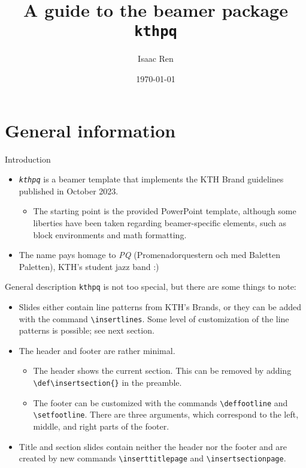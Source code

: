 \documentclass[17pt, t, lualatex]{beamer}
\title{A guide to the beamer package \texttt{kthpq}}
\date{\today}
\institute[KTH]{KTH Royal Institute of Technology}
\author[Isaac Ren]{Isaac Ren}
\def\kthpq{\texttt{kthpq}}
\begin{document}
\inserttitlepage[center]

\begin{frame}
\tableofcontents
\end{frame}

\section{General information}

\insertsectionpage

\begin{frame}{Introduction}
\begin{itemize}
\item \emph{\kthpq{}} is a beamer template that implements the KTH Brand guidelines published in October 2023.
\begin{itemize}
\item The starting point is the provided PowerPoint template, although some liberties have been taken regarding beamer-specific elements, such as block environments and math formatting.
\end{itemize}
\item The name pays homage to \emph{PQ} (Promenadorquestern och med Baletten Paletten), KTH's student jazz band :)
\end{itemize}
\end{frame}

\begin{frame}[fragile=singleslide]{General description}
\kthpq{} is not too special, but there are some things to note:
\begin{itemize}
\item Slides either contain line patterns from KTH's Brands, or they can be added with the command \verb|\insertlines|. Some level of customization of the line patterns is possible; see next section.
\item The header and footer are rather minimal.
\begin{itemize}
\item The header shows the current section. This can be removed by adding \verb|\def\insertsection{}| in the preamble.
\item The footer can be customized with the commands \verb|\deffootline| and \verb|\setfootline|. There are three arguments, which correspond to the left, middle, and right parts of the footer.
\end{itemize}
\item Title and section slides contain neither the header nor the footer and are created by new commands \verb|\inserttitlepage| and \verb|\insertsectionpage|.
\end{itemize}
\end{frame}
\end{document}
